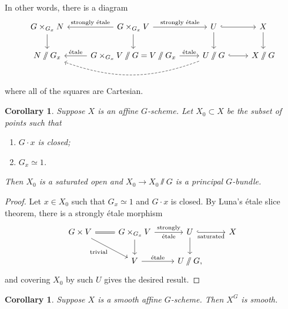 \documentclass{amsart}
\newtheorem{cor}[thm]{Corollary}
\theoremstyle{definition}
\theoremstyle{remark}
\theoremstyle{plain}
\theoremstyle{definition}
\theoremstyle{remark}
\newcommand{\1}{\mathbf{1}}
\newcommand{\2}{\mathbf{2}}
\newcommand{\3}{\mathbf{3}}
\begin{document}
In other words, there is a diagram
\begin{equation*}
\begin{tikzcd}
    G \times_{G_x} N \ar{d} & G \times_{G_x} V \ar{d} \ar{l}[swap]{\text{strongly \'etale}} \ar{r}{\text{strongly \'etale}} & U \ar[hookrightarrow]{r} \ar{d} & X \ar{d} \\
    N \sslash G_x & G \times_{G_x} V \sslash G = V \sslash G_x \ar{l}[swap]{\text{\'etale}} \ar{r}{\text{\'etale}} & U \sslash G \ar[hookrightarrow]{r} \ar[bend left=20, dashed]{ll} & X \sslash G
\end{tikzcd}
\end{equation*}
where all of the squares are Cartesian.

\begin{cor}
    Suppose \(X\) is an affine \(G\)-scheme. Let \(X_0 \subset X\) be the subset of points such that
    \begin{enumerate}
        \item \(G \cdot x\) is closed;
        \item \(G_x \simeq 1\).
    \end{enumerate}
    Then \(X_0\) is a saturated open and \(X_0 \to X_0 \sslash G\) is a principal \(G\)-bundle.
\end{cor}

\begin{proof}
    Let \(x \in X_0\) such that \(G_x \simeq 1\) and \(G \cdot x\) is closed. By Luna's \'etale slice theorem, there is a strongly \'etale morphism
    \begin{equation*}
    \begin{tikzcd}
        G \times V \ar[equals]{r} \ar{dr}[swap]{\text{trivial}} & G \times_{G_x} V \ar{d} \ar{r}{\text{strongly}}[swap]{\text{\'etale}} & U \ar[hookrightarrow]{r}[swap]{\text{saturated}} \ar{d} & X \\
        & V \ar{r}{\text{\'etale}} & U \sslash G,
    \end{tikzcd}
    \end{equation*}
    and covering \(X_0\) by such \(U\) gives the desired result.
\end{proof}

\begin{cor}
    Suppose \(X\) is a smooth affine \(G\)-scheme. Then \(X^G\) is smooth.
\end{cor}
\end{document}
